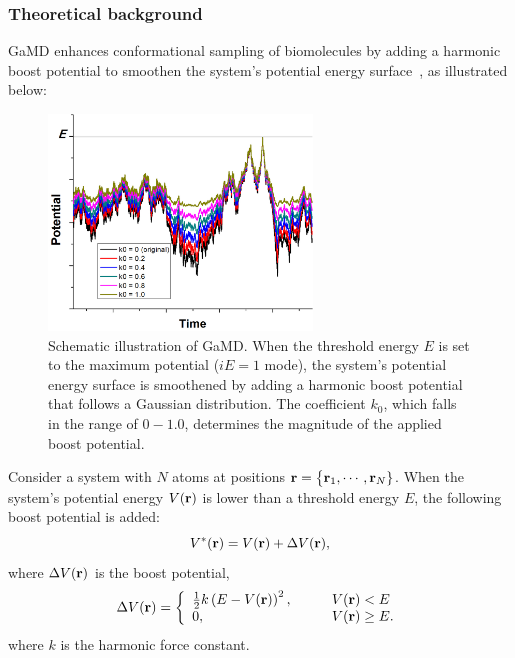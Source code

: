\subsubsection{Theoretical background}
GaMD enhances conformational sampling of biomolecules by adding a harmonic boost potential to smoothen the system's potential energy surface~\cite{MIAO2015mc}, as illustrated below:

\begin{figure}[!ht]
  \centering
  \includegraphics[width=7cm]{figures/GaMD-scheme.jpg}
  \caption{Schematic illustration of GaMD. When the threshold energy $E$ is set to the maximum potential ($iE=1$ mode), the system's potential energy surface is smoothened by adding a harmonic boost potential that follows a Gaussian distribution. The coefficient $k_0$, which falls in the range of $0 - 1.0$, determines the magnitude of the applied boost potential.}
  \label{fig:amd_schematic}
\end{figure}

Consider a system with $N$ atoms at positions ${\bf r} = \big\{{\bf r}_1,\cdots,{\bf r}_N \}$. 
When the system's potential energy $V({\bf r})$ is lower than a threshold energy $E$, the following boost potential is added:
\begin{equation}
V^*({\bf r})= V({\bf r}) + \Delta V({\bf r}),
\end{equation}
where $\Delta V({\bf r})$ is the boost potential, 
\begin{equation} 
\Delta V({\bf r})= \left \{
\begin{array}{l l}
\frac{1}{2} k \left( E - V({\bf r}) \right)^2,  & \qquad V({\bf r})<E \\
0,   & \qquad V({\bf r})\geq E. \\  
\end{array} \right. 
\end{equation}
where $k$ is the harmonic force constant.

